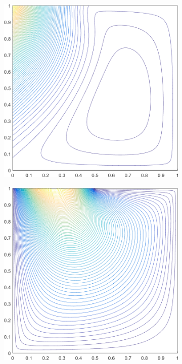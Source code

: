 \begin{figure}
{\begin{subfigure}[b]{0.375\textwidth}
	\end{subfigure}
}
\vspace{3mm}
{
	\begin{subfigure}[b]{0.375\textwidth}
		\centering
		\includegraphics[width=\textwidth]{figures/sec_BF/deg_square_MV2_contour_b5.png}
	\end{subfigure}
	\hspace{1.5cm}
	\begin{subfigure}[b]{0.375\textwidth}
		\centering
		\includegraphics[width=\textwidth]{figures/sec_BF/deg_square_MV2_contour_b9.png}

\end{subfigure}}
\end{figure}
